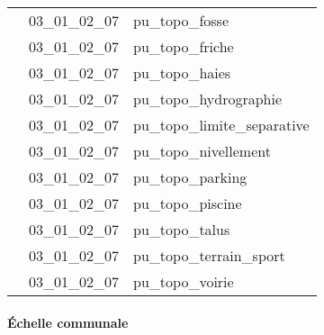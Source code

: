 \documentclass[12pt,titlepage]{book}
\begin{document}
\begin{supertabular}{|p{10cm}|c|p{15cm}|}
                    & 03\_01\_02\_07 & pu\_topo\_fosse\\


                    & 03\_01\_02\_07 & pu\_topo\_friche\\


                    & 03\_01\_02\_07 & pu\_topo\_haies\\


                    & 03\_01\_02\_07 & pu\_topo\_hydrographie\\


                    & 03\_01\_02\_07 & pu\_topo\_limite\_separative\\


                    & 03\_01\_02\_07 & pu\_topo\_nivellement\\


                    & 03\_01\_02\_07 & pu\_topo\_parking\\


                    & 03\_01\_02\_07 & pu\_topo\_piscine\\


                    & 03\_01\_02\_07 & pu\_topo\_talus\\


                    & 03\_01\_02\_07 & pu\_topo\_terrain\_sport\\


                    & 03\_01\_02\_07 & pu\_topo\_voirie\\
\hline
\end{supertabular}


\paragraph{Échelle communale}
\noindent
\vspace{\baselineskip}
\end{document}
